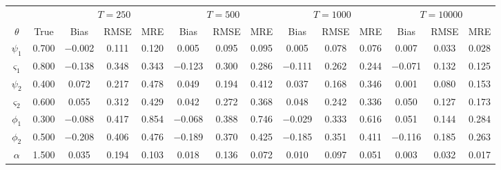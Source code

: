 \begin{tabular}{cccccccccccccc}
\toprule
 &  & \multicolumn{3}{c}{$T = 250$} & \multicolumn{3}{c}{$T = 500$} & \multicolumn{3}{c}{$T = 1000$} & \multicolumn{3}{c}{$T = 10000$} \\
\cmidrule(lr){3-5} \cmidrule(lr){6-8} \cmidrule(lr){9-11} \cmidrule(lr){12-14}
$\theta$ & True & Bias & RMSE & MRE & Bias & RMSE & MRE & Bias & RMSE & MRE & Bias & RMSE & MRE \\
\midrule
$\psi_1$ & 0.700 & $-$0.002 & 0.111 & 0.120 & 0.005 & 0.095 & 0.095 & 0.005 & 0.078 & 0.076 & 0.007 & 0.033 & 0.028 \\
$\varsigma_1$ & 0.800 & $-$0.138 & 0.348 & 0.343 & $-$0.123 & 0.300 & 0.286 & $-$0.111 & 0.262 & 0.244 & $-$0.071 & 0.132 & 0.125 \\
$\psi_2$ & 0.400 & 0.072 & 0.217 & 0.478 & 0.049 & 0.194 & 0.412 & 0.037 & 0.168 & 0.346 & 0.001 & 0.080 & 0.153 \\
$\varsigma_2$ & 0.600 & 0.055 & 0.312 & 0.429 & 0.042 & 0.272 & 0.368 & 0.048 & 0.242 & 0.336 & 0.050 & 0.127 & 0.173 \\
$\phi_1$ & 0.300 & $-$0.088 & 0.417 & 0.854 & $-$0.068 & 0.388 & 0.746 & $-$0.029 & 0.333 & 0.616 & 0.051 & 0.144 & 0.284 \\
$\phi_2$ & 0.500 & $-$0.208 & 0.406 & 0.476 & $-$0.189 & 0.370 & 0.425 & $-$0.185 & 0.351 & 0.411 & $-$0.116 & 0.185 & 0.263 \\
$\alpha$ & 1.500 & 0.035 & 0.194 & 0.103 & 0.018 & 0.136 & 0.072 & 0.010 & 0.097 & 0.051 & 0.003 & 0.032 & 0.017 \\
\bottomrule
\end{tabular}